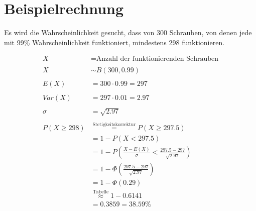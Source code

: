 \section{Beispielrechnung}
Es wird die Wahrscheinlichkeit gesucht, dass von 300 Schrauben, von denen jede mit 99\% Wahrscheinlichkeit funktioniert, mindestens 298 funktionieren.

\begin{align*}
    X &= \text{Anzahl der funktionierenden Schrauben} \\\\
    X &\sim B(300, 0.99) \\\\
    E(X) &= 300 \cdot 0.99 = 297 \\\\
    Var(X) &= 297 \cdot 0.01 = 2.97 \\\\
    \sigma &= \sqrt{2.97} \\\\
    P(X \ge 298) &\overset{\text{Stetigkeitskorrektur}}{=} P(X \ge 297.5) \\
    &= 1 - P(X < 297.5) \\
    &= 1 - P\left(\frac{X - E(X)}{\sigma} < \frac{297.5 - 297}{\sqrt{2.97}}\right) \\
    &= 1 - \Phi\left(\frac{297.5 - 297}{\sqrt{2.97}}\right) \\
    &= 1 - \Phi(0.29) \\
    &\overset{\text{Tabelle}}{\approx} 1 - 0.6141 \\
    &= 0.3859 = 38.59\% 
\end{align*}